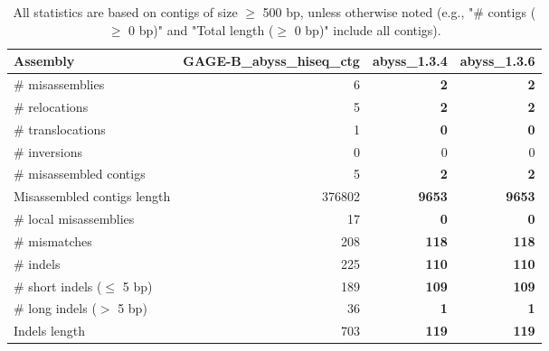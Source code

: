 \documentclass[12pt,a4paper]{article}
\begin{document}
\begin{table}[ht]
\begin{center}
\caption{All statistics are based on contigs of size $\geq$ 500 bp, unless otherwise noted (e.g., "\# contigs ($\geq$ 0 bp)" and "Total length ($\geq$ 0 bp)" include all contigs).}
\begin{tabular}{|l*{3}{|r}|}
\hline
Assembly & GAGE-B\_abyss\_hiseq\_ctg & abyss\_1.3.4 & abyss\_1.3.6 \\ \hline
\# misassemblies & 6 & {\bf 2} & {\bf 2} \\ \hline
\hspace{5mm}\# relocations & 5 & {\bf 2} & {\bf 2} \\ \hline
\hspace{5mm}\# translocations & 1 & {\bf 0} & {\bf 0} \\ \hline
\hspace{5mm}\# inversions & 0 & 0 & 0 \\ \hline
\# misassembled contigs & 5 & {\bf 2} & {\bf 2} \\ \hline
Misassembled contigs length & 376802 & {\bf 9653} & {\bf 9653} \\ \hline
\# local misassemblies & 17 & {\bf 0} & {\bf 0} \\ \hline
\# mismatches & 208 & {\bf 118} & {\bf 118} \\ \hline
\# indels & 225 & {\bf 110} & {\bf 110} \\ \hline
\hspace{5mm}\# short indels ($\leq$ 5 bp) & 189 & {\bf 109} & {\bf 109} \\ \hline
\hspace{5mm}\# long indels ($>$ 5 bp) & 36 & {\bf 1} & {\bf 1} \\ \hline
Indels length & 703 & {\bf 119} & {\bf 119} \\ \hline
\end{tabular}
\end{center}
\end{table}
\end{document}
